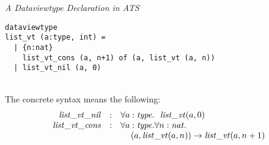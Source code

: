 \documentclass[pdf]{prosper}
\begin{document}
\def\vtList{{\it list\_vt}}
\def\cListvtNil{{\it list\_vt\_nil}}
\def\cListvtCons{{\it list\_vt\_cons}}
\begin{slide}{\em A Dataviewtype Declaration in ATS}
{\blue\begin{verbatim}
dataviewtype
list_vt (a:type, int) =
  | {n:nat}
    list_vt_cons (a, n+1) of (a, list_vt (a, n))
  | list_vt_nil (a, 0)
\end{verbatim}}~\\
The concrete syntax means the following:
\[\begin{array}{rcl}
\cListvtNil  &:& \forall a:\stype.~~\vtList(a,0) \\
\cListvtCons &:& \forall a:\stype.\forall n:\snat.~~\\
             & &\kern12pt(a, \vtList(a,n))\timp\vtList(a,n+1) \\
\end{array}\]
\end{slide}
\end{document}
